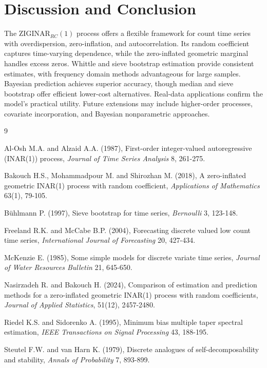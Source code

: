 \documentclass[twoside]{article}
\begin{document}
\section*{Discussion and Conclusion}
The $\text{ZIGINAR}_{RC}(1)$ process offers a flexible framework for count time series with overdispersion, zero-inflation, and autocorrelation. Its random coefficient captures time-varying dependence, while the zero-inflated geometric marginal handles excess zeros. Whittle and sieve bootstrap estimation provide consistent estimates, with frequency domain methods advantageous for large samples. Bayesian prediction achieves superior accuracy, though median and sieve bootstrap offer efficient lower-cost alternatives. Real-data applications confirm the model's practical utility. Future extensions may include higher-order processes, covariate incorporation, and Bayesian nonparametric approaches.
\begin{thebibliography}{9}

Al-Osh M.A. and Alzaid A.A. (1987), First-order integer-valued autoregressive (INAR(1)) process, {\it Journal of Time Series Analysis} 8, 261-275.

Bakouch H.S., Mohammadpour M. and Shirozhan M. (2018), A zero-inflated geometric INAR(1) process with random coefficient, {\it Applications of Mathematics} 63(1), 79-105.

B\"uhlmann P. (1997), Sieve bootstrap for time series, {\it Bernoulli} 3, 123-148.

Freeland R.K. and McCabe B.P. (2004), Forecasting discrete valued low count time series, {\it International Journal of Forecasting} 20, 427-434.

McKenzie E. (1985), Some simple models for discrete variate time series, {\it Journal of Water Resources Bulletin} 21, 645-650.

Nasirzadeh R. and Bakouch H. (2024), Comparison of estimation and prediction methods for a zero-inflated geometric INAR(1) process with random coefficients, {\it Journal of Applied Statistics}, 51(12), 2457-2480.

Riedel K.S. and Sidorenko A. (1995), Minimum bias multiple taper spectral estimation, {\it IEEE Transactions on Signal Processing} 43, 188-195.

Steutel F.W. and van Harn K. (1979), Discrete analogues of self-decomposability and stability, {\it Annals of Probability} 7, 893-899.

\end{thebibliography}
\end{document}
